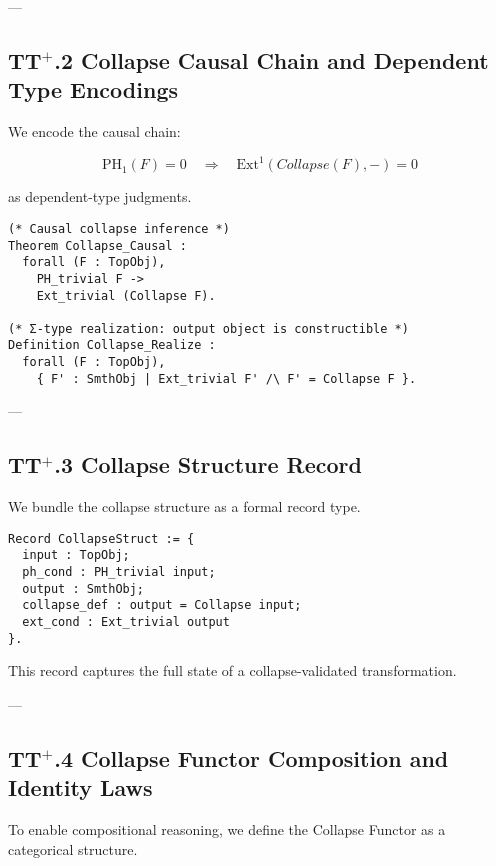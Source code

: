 \documentclass[11pt]{article}
\begin{document}
---

\subsection*{TT$^{+}$.2 Collapse Causal Chain and Dependent Type Encodings}

We encode the causal chain:

\[
\mathrm{PH}_1(F) = 0 \quad \Rightarrow \quad \mathrm{Ext}^1(Collapse(F), -) = 0
\]

as dependent-type judgments.

\begin{lstlisting}[language=Coq]
(* Causal collapse inference *)
Theorem Collapse_Causal :
  forall (F : TopObj),
    PH_trivial F ->
    Ext_trivial (Collapse F).

(* Σ-type realization: output object is constructible *)
Definition Collapse_Realize :
  forall (F : TopObj),
    { F' : SmthObj | Ext_trivial F' /\ F' = Collapse F }.
\end{lstlisting}

---

\subsection*{TT$^{+}$.3 Collapse Structure Record}

We bundle the collapse structure as a formal record type.

\begin{lstlisting}[language=Coq]
Record CollapseStruct := {
  input : TopObj;
  ph_cond : PH_trivial input;
  output : SmthObj;
  collapse_def : output = Collapse input;
  ext_cond : Ext_trivial output
}.
\end{lstlisting}

This record captures the full state of a collapse-validated transformation.

---

\subsection*{TT$^{+}$.4 Collapse Functor Composition and Identity Laws}

To enable compositional reasoning, we define the Collapse Functor as a categorical structure.
\end{document}
